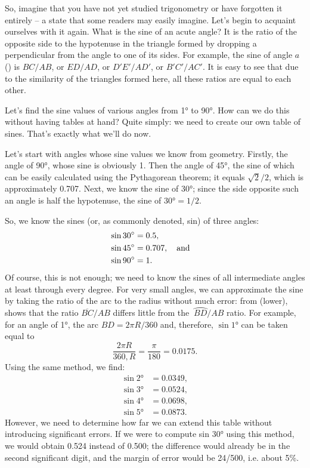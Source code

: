 So, imagine that you have not yet studied trigonometry or have forgotten it entirely -- a state that some readers may easily imagine. Let's begin to acquaint ourselves with it again. What is the sine of an acute angle? It is the ratio of the opposite side to the hypotenuse in the triangle formed by dropping a perpendicular from the angle to one of its sides. For example, the sine of angle $a$ () is $BC/AB$, or $ED/AD$, or $D'E'/AD'$, or $B'C'/AC'$. It is easy to see that due to the similarity of the triangles formed here, all these ratios are equal to each other.

Let's find the sine values of various angles from \ang{1} to \ang{90}. How can we do this without having tables at hand? Quite simply: we need to create our own table of sines. That's exactly what we'll do now.

Let's start with angles whose sine values we know from geometry. Firstly, the angle of \ang{90}, whose sine is obviously 1. Then the angle of \ang{45}, the sine of which can be easily calculated using the Pythagorean theorem; it equals $\sqrt{2}/2$, which is approximately 0.707. Next, we know the sine of \ang{30}; since the side opposite such an angle is half the hypotenuse, the sine of $\ang{30} = 1/2$.

So, we know the sines (or, as commonly denoted, sin) of three angles: 
\begin{align*}%
\sin \ang{30} & = 0.5, \\
\sin \ang{45} & = 0.707, \qand \\
\sin \ang{90} & = 1.
\end{align*}
Of course, this is not enough; we need to know the sines of all intermediate angles at least through every degree. For very small angles, we can approximate the sine by taking the ratio of the arc to the radius without much error: from  (lower),
shows that the ratio $\overline{BC}/AB$ differs little from the $\ \wideparen{BD}/AB$ ratio. For example, for an angle of \ang{1}, the arc $BD = 2\pi R/360$ and, therefore, $\sin \ang{1}$ can be taken equal to
\begin{equation*}%
\frac{2 \pi R}{360 , R} = \frac{\pi}{180} = 0.0175. 
\end{equation*}
Using the same method, we find: 
\begin{align*}%
\sin \ang{2} & = 0.0349, \\
\sin \ang{3} & = 0.0524,\\
\sin \ang{4} & = 0.0698, \\
\sin \ang{5} & = 0.0873.
\end{align*}
However, we need to determine how far we can extend this table without introducing significant errors. If we were to compute sin \ang{30} using this method, we would obtain 0.524 instead of 0.500; the difference would already be in the second significant digit, and the margin of error would be 24/500, i.e. about 5\%.

